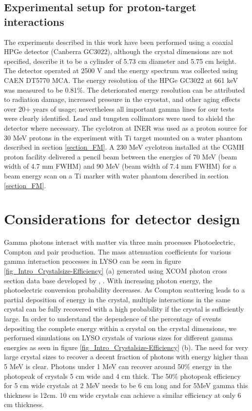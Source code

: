 \documentclass[11pt,a4paper]{article}
\begin{document}
\subsection{Experimental setup for proton-target interactions}
\label{section_ExperimentalSetup}
The experiments described in this  work have been performed using a coaxial HPGe detector (Canberra GC3022), although the crystal dimensions are not specified, \cite{Jeskovsky2019} describe it to be a cylinder of 5.73 cm diameter and 5.75 cm height. The detector operated at 2500 V and the energy spectrum was collected using  CAEN DT5770 MCA. The energy resolution of the HPGe GC3022 at 661 keV was measured to be 0.81\%. The deteriorated energy resolution can be attributed to radiation damage, increased pressure in the cryostat, and other aging effects over 20+ years of usage; nevertheless all important gamma lines for our  tests were clearly identified.  Lead and tungsten collimators were used to shield the detector where necessary. The cyclotron at INER was used as a proton source for 30 MeV protons in the experiment with Ti target mounted on a water phantom described in section \ref{section_FM}. A 230 MeV cyclotron installed at the CGMH proton facility delivered a pencil  beam between the energies of 70 MeV (beam width of 4.7 mm FWHM) and 90 MeV (beam width of 7.4 mm FWHM) for a beam energy scan on a Ti marker with water phantom described in section \ref{section_FM}.



\section{Considerations for detector design}
\label{section_DetectorDesign}
Gamma photons interact with matter via three main processes Photoelectric, Compton and pair production. The mass attenuation coefficients for various gamma interaction processes in LYSO can be seen in figure \ref{fig_Intro_Crystalsize-Efficiency} (a) generated using XCOM photon cross section data base developed by \cite{XCOM1} , \cite{XCOM2}.  With increasing photon energy, the photoelectric conversion probability decreases. As Compton scattering leads to a partial deposition of energy in the crystal, multiple interactions in the same crystal can be fully recovered with a high probability if the crystal is sufficiently large. In order to understand the dependence of the percentage of events depositing the complete energy within a crystal on the crystal dimensions, we performed simulations on LYSO crystals of various sizes for different gamma energies as seen in  figure \ref{fig_Intro_Crystalsize-Efficiency} (b). The need for very large crystal sizes to recover a decent fraction of photons with energy higher than 5 MeV is clear. Photons under 1 MeV can recover around 50\% energy in the photopeak of crystals 5 cm wide and 4 cm thick. The 50\% photopeak efficiency for 5 cm wide crystals at 2  MeV  needs to be 6 cm long and for 5MeV gamma this thickness is  12cm. 10 cm wide crystals can achieve a similar efficiency at only 6 cm thickness. 
\end{document}
